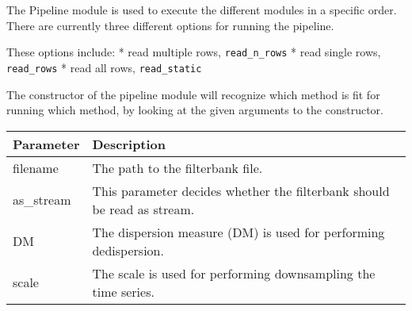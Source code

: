 \documentclass[]{article}
\begin{document}
The Pipeline module is used to execute the different modules in a
specific order. There are currently three different options for running
the pipeline.

These options include: * read multiple rows, \texttt{read\_n\_rows} *
read single rows, \texttt{read\_rows} * read all rows,
\texttt{read\_static}

The constructor of the pipeline module will recognize which method is
fit for running which method, by looking at the given arguments to the
constructor.

\begin{longtable}[]{@{}ll@{}}
\toprule
\begin{minipage}[b]{0.41\columnwidth}\raggedright\strut
Parameter\strut
\end{minipage} & \begin{minipage}[b]{0.41\columnwidth}\raggedright\strut
Description\strut
\end{minipage}\tabularnewline
\midrule
\endhead
\begin{minipage}[t]{0.41\columnwidth}\raggedright\strut
filename\strut
\end{minipage} & \begin{minipage}[t]{0.41\columnwidth}\raggedright\strut
The path to the filterbank file.\strut
\end{minipage}\tabularnewline
\begin{minipage}[t]{0.41\columnwidth}\raggedright\strut
as\_stream\strut
\end{minipage} & \begin{minipage}[t]{0.41\columnwidth}\raggedright\strut
This parameter decides whether the filterbank should be read as
stream.\strut
\end{minipage}\tabularnewline
\begin{minipage}[t]{0.41\columnwidth}\raggedright\strut
DM\strut
\end{minipage} & \begin{minipage}[t]{0.41\columnwidth}\raggedright\strut
The dispersion measure (DM) is used for performing dedispersion.\strut
\end{minipage}\tabularnewline
\begin{minipage}[t]{0.41\columnwidth}\raggedright\strut
scale\strut
\end{minipage} & \begin{minipage}[t]{0.41\columnwidth}\raggedright\strut
The scale is used for performing downsampling the time series.\strut
\end{minipage}\tabularnewline

\end{longtable}
\end{document}
